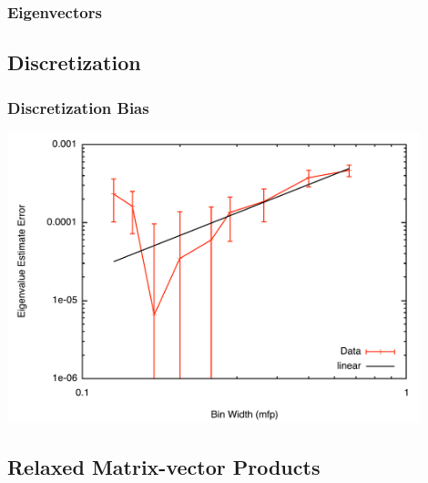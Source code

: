 \documentclass[color={usenames, dvipsnames},ignorenonframetext]{beamer}
\begin{document}
\begin{frame}
    \frametitle{Eigenvectors}
\end{frame}

\subsection{Discretization}
\begin{frame}
    \frametitle{Discretization Bias}
    \begin{center}\includegraphics[width=0.90\textwidth, keepaspectratio]{Bias}\end{center}
\end{frame}

\subsection{Relaxed Matrix-vector Products}
\end{document}
